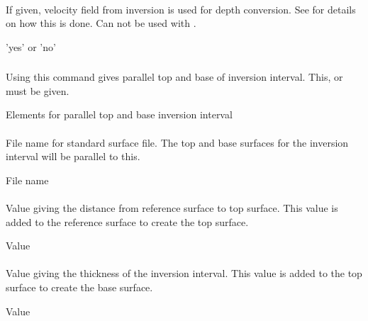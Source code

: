\paragraph{} 
 \slist
   \item \Description If given, velocity field from inversion is used for depth conversion. See  for details on how this is done. Can not be used with .
   \item \Argument 'yes' or 'no'
   \item \Default
 \elist

\subsubsection{} 
 \slist
   \item \Description Using this command gives parallel top and base of inversion interval. This,  or  must be given.
   \item \Argument Elements for parallel top and base inversion interval
   \item \Default
 \elist

\paragraph{} 
 \slist
   \item \Description File name for standard surface file. The top and base surfaces for the inversion interval will be parallel to this.
   \item \Argument File name
   \item \Default
 \elist

\paragraph{} 
 \slist
   \item \Description Value giving the distance from reference surface to top surface. This value is added to the reference surface to create the top surface.
   \item \Argument Value
   \item \Default
 \elist

\paragraph{}
 \slist
   \item \Description Value giving the thickness of the inversion interval. This value is added to the top surface to create the base surface.
   \item \Argument Value
   \item \Default
 \elist

